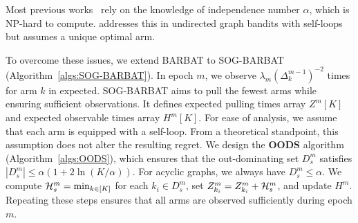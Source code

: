 Most previous works~\citep{ito2022nearly,dann2023blackbox,eldowa2024minimax} rely on the knowledge of independence number $\alpha$, which is NP-hard to compute. \cite{ito2024adaptive} addresses this in undirected graph bandits with self-loops but assumes a unique optimal arm.

To overcome these issues, we extend BARBAT to SOG-BARBAT (Algorithm~\ref{algs:SOG-BARBAT}). In epoch $m$, we observe $\lambda_m (\Delta_k^{m-1})^{-2}$ times for arm $k$ in expected. SOG-BARBAT aims to pull the fewest arms while ensuring sufficient observations. It defines expected pulling times array $Z^m[K]$ and expected observable times array $H^m[K]$. For ease of analysis, we assume that each arm is equipped with a self-loop. From a theoretical standpoint, this assumption does not alter the resulting regret.
We design the \textbf{OODS} algorithm (Algorithm~\ref{algs:OODS}), which ensures that the out-dominating set $D_s^m$ satisfies $|D_s^m| \leq \alpha(1+2\ln(K/\alpha))$. For acyclic graphs, we always have $D_s^m \leq \alpha$. We compute ${\mathcal{H}}_s^m = \min_{k \in [K]}$ for each $k_i \in D_s^m$, set $Z_{k_i}^m = Z_{k_i}^m + {\mathcal{H}}_s^m$, and update $H^m$. Repeating these steps ensures that all arms are observed sufficiently during epoch $m$.
